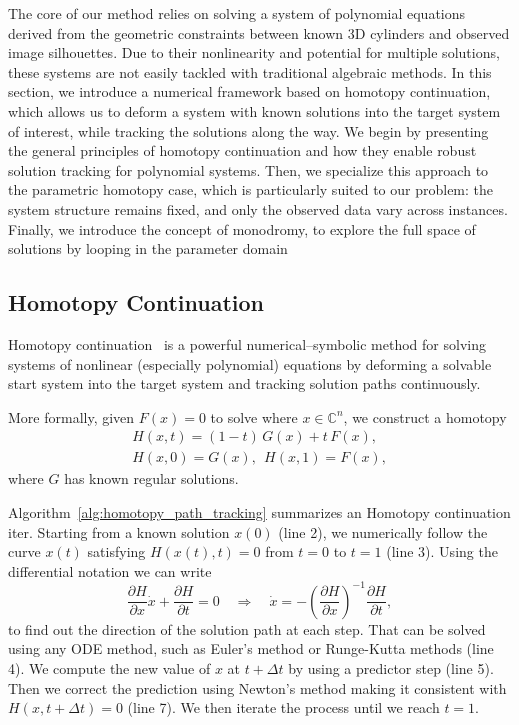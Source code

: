 The core of our method relies on solving a system of polynomial equations derived from the geometric constraints between known 3D cylinders and observed image silhouettes. Due to their nonlinearity and potential for multiple solutions, these systems are not easily tackled with traditional algebraic methods. In this section, we introduce a numerical framework based on homotopy continuation, which allows us to deform a system with known solutions into the target system of interest, while tracking the solutions along the way.
We begin by presenting the general principles of homotopy continuation and how they enable robust solution tracking for polynomial systems. Then, we specialize this approach to the parametric homotopy case, which is particularly suited to our problem: the system structure remains fixed, and only the observed data vary across instances. Finally, we introduce the concept of monodromy, to explore the full space of solutions by looping in the parameter domain

\subsection{Homotopy Continuation}
\label{sec:homotopy}

Homotopy continuation~\cite{HomotophyContinuationMethods} is a powerful numerical–symbolic method for solving systems of nonlinear (especially polynomial) equations by deforming a solvable start system into the target system and tracking solution paths continuously.

More formally, given \(F(x)=0\) to solve where \(x\in\mathbb{C}^n\), we construct a homotopy
\begin{align}
H(x,t) = (1-t)\,G(x) + t\,F(x), \\ H(x,0)=G(x),\, \; H(x,1)=F(x),
\end{align}
where \(G\) has known regular solutions.

Algorithm~\ref{alg:homotopy_path_tracking} summarizes an Homotopy continuation iter.
Starting from a known solution \(x(0)\) (line 2), we numerically follow the curve \(x(t)\) satisfying \(H(x(t), t)=0\) from $t=0$ to $t=1$ (line 3).
Using the differential notation we can write
\[
\frac{\partial H}{\partial x} \dot x + \frac{\partial H}{\partial t} = 0 \quad\Rightarrow\quad \dot x = -\left(\frac{\partial H}{\partial x}\right)^{-1} \frac{\partial H}{\partial t},
\]
to find out the direction of the solution path at each step. That can be solved using any ODE method, such as Euler's method or Runge-Kutta methods (line 4).
We compute the new value of \(x\) at \(t+\Delta t\) by using a predictor step (line 5).
Then we correct the prediction using Newton’s method making it consistent with \(H(x, t+\Delta t)=0\) (line 7).
We then iterate the process until we reach $t=1$.

